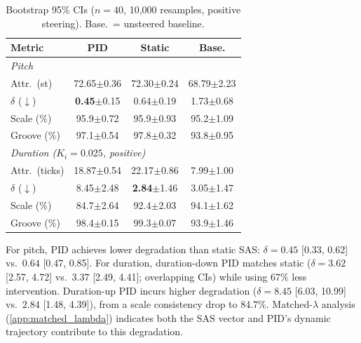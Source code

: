 \documentclass{article}
\theoremstyle{plain}
\begin{document}
\begin{table}[h]
  \caption{Bootstrap 95\% CIs ($n{=}40$, 10,000 resamples, positive steering). Base.\ = unsteered baseline.}
  \label{tab:ci}
  \begin{center}
  \begin{small}
  \begin{tabular}{lccc}
    \toprule
    Metric & PID & Static & Base. \\
    \midrule
    \multicolumn{4}{l}{\textit{Pitch}} \\
    Attr.\ (st) & 72.65{\scriptsize$\pm$0.36} & 72.30{\scriptsize$\pm$0.24} & 68.79{\scriptsize$\pm$2.23} \\
    $\delta$ ($\downarrow$) & \textbf{0.45}{\scriptsize$\pm$0.15} & 0.64{\scriptsize$\pm$0.19} & 1.73{\scriptsize$\pm$0.68} \\
    Scale (\%) & 95.9{\scriptsize$\pm$0.72} & 95.9{\scriptsize$\pm$0.93} & 95.2{\scriptsize$\pm$1.09} \\
    Groove (\%) & 97.1{\scriptsize$\pm$0.54} & 97.8{\scriptsize$\pm$0.32} & 93.8{\scriptsize$\pm$0.95} \\
    \midrule
    \multicolumn{4}{l}{\textit{Duration ($K_i{=}0.025$, positive)}} \\
    Attr.\ (ticks) & 18.87{\scriptsize$\pm$0.54} & 22.17{\scriptsize$\pm$0.86} & 7.99{\scriptsize$\pm$1.00} \\
    $\delta$ ($\downarrow$) & 8.45{\scriptsize$\pm$2.48} & \textbf{2.84}{\scriptsize$\pm$1.46} & 3.05{\scriptsize$\pm$1.47} \\
    Scale (\%) & 84.7{\scriptsize$\pm$2.64} & 92.4{\scriptsize$\pm$2.03} & 94.1{\scriptsize$\pm$1.62} \\
    Groove (\%) & 98.4{\scriptsize$\pm$0.15} & 99.3{\scriptsize$\pm$0.07} & 93.9{\scriptsize$\pm$1.46} \\
    \bottomrule
  \end{tabular}
  \end{small}
  \end{center}
\end{table}

For pitch, PID achieves lower degradation than static SAS: $\delta{=}0.45$ [0.33, 0.62] vs.\ $0.64$ [0.47, 0.85]. For duration, duration-down PID matches static ($\delta{=}3.62$ [2.57, 4.72] vs.\ $3.37$ [2.49, 4.41]; overlapping CIs) while using 67\% less intervention. Duration-up PID incurs higher degradation ($\delta{=}8.45$ [6.03, 10.99] vs.\ $2.84$ [1.48, 4.39]), from a scale consistency drop to 84.7\%. Matched-$\lambda$ analysis (\cref{app:matched_lambda}) indicates both the SAS vector and PID's dynamic trajectory contribute to this degradation.
\end{document}

